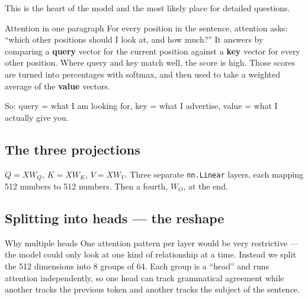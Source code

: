\documentclass[11pt]{report}
\newcommand{\p}[1]{\texttt{#1}}
\begin{document}
This is the heart of the model and the most likely place for detailed questions.

\begin{concept}{Attention in one paragraph}
For every position in the sentence, attention asks: ``which other positions
should I look at, and how much?'' It answers by comparing a \textbf{query}
vector for the current position against a \textbf{key} vector for every other
position. Where query and key match well, the score is high. Those scores are
turned into percentages with softmax, and then used to take a weighted average
of the \textbf{value} vectors.

So: query = what I am looking for, key = what I advertise, value = what I
actually give you.
\end{concept}

\subsection{The three projections}

$Q = XW_Q$, $K = XW_K$, $V = XW_V$. Three separate \p{nn.Linear} layers, each
mapping 512 numbers to 512 numbers. Then a fourth, $W_O$, at the end.

\subsection{Splitting into heads --- the reshape}

\begin{concept}{Why multiple heads}
One attention pattern per layer would be very restrictive --- the model could
only look at one kind of relationship at a time. Instead we split the 512
dimensions into 8 groups of 64. Each group is a ``head'' and runs attention
independently, so one head can track grammatical agreement while another tracks
the previous token and another tracks the subject of the sentence.
\end{concept}
\end{document}
